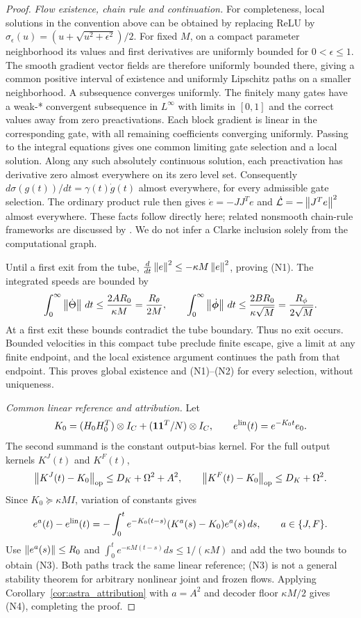 \begin{proof}
\emph{Flow existence, chain rule and continuation.}
For completeness, local solutions in the convention above can be
obtained by replacing ReLU by
$\sigma_\epsilon(u)=(u+\sqrt{u^2+\epsilon^2})/2$.
For fixed $M$, on a compact parameter neighborhood its values and
first derivatives are uniformly bounded for $0<\epsilon\le1$.
The smooth gradient vector fields are therefore uniformly bounded
there, giving a common positive interval of existence and uniformly
Lipschitz paths on a smaller neighborhood. A subsequence converges
uniformly. The finitely many gates have a weak-* convergent subsequence
in $L^\infty$ with limits in $[0,1]$ and the correct values away from
zero preactivations. Each block gradient is linear in the corresponding
gate, with all remaining coefficients converging uniformly. Passing
to the integral equations gives one common limiting gate selection
and a local solution.
Along any such absolutely continuous solution, each preactivation
has derivative zero almost everywhere on its zero level set.
Consequently $d\sigma(g(t))/dt=\gamma(t)\dot g(t)$ almost everywhere,
for every admissible gate selection. The ordinary product rule then
gives $\dot e=-JJ^Te$ and
$\dot{\mathcal{L}}=-\left\lVert J^Te\right\rVert^2$ almost everywhere. These facts follow
directly here; related nonsmooth chain-rule frameworks are discussed
by \citet{astra_davis2020,astra_bolte2021}. We do not infer a Clarke
inclusion solely from the computational graph.

Until a first exit from the tube,
$\frac d{dt}\left\lVert e\right\rVert^2\le-\kappa M\left\lVert e\right\rVert^2$, proving (N1).
The integrated speeds are bounded by
\[
 \int_0^\infty\left\lVert\dot\Theta\right\rVert\,dt\le\frac{2AR_0}{\kappa M}
     =\frac{R_\theta}{2M},\qquad
 \int_0^\infty\left\lVert\dot{{\boldsymbol{\phi}}}\right\rVert\,dt
     \le\frac{2BR_0}{\kappa\sqrt M}
     =\frac{R_\phi}{2\sqrt M}.
\]
At a first exit these bounds contradict the tube boundary. Thus no
exit occurs. Bounded velocities in this compact tube preclude finite
escape, give a limit at any finite endpoint, and the local existence
argument continues the path from that endpoint. This proves global
existence and (N1)--(N2) for every selection, without uniqueness.

\emph{Common linear reference and attribution.}
Let
\[
 K_0=(H_0H_0^T)\otimes I_C+
             (\mathbf1\mathbf1^T/N)\otimes I_C,
 \qquad e^{\rm lin}(t)=e^{-K_0t}e_0.
\]
The second summand is the constant output-bias kernel.
For the full output kernels $K^J(t)$ and $K^F(t)$,
\[
 \left\lVert K^J(t)-K_0\right\rVert_{\rm op}\le D_K+\Omega^2+A^2,
 \qquad
 \left\lVert K^F(t)-K_0\right\rVert_{\rm op}\le D_K+\Omega^2.
\]
Since $K_0\succeq\kappa MI$, variation of constants gives
\[
 e^a(t)-e^{\rm lin}(t)
 =-\int_0^t e^{-K_0(t-s)}(K^a(s)-K_0)e^a(s)\,ds,
 \qquad a\in\{J,F\}.
\]
Use $\left\lVert e^a(s)\right\rVert\le R_0$ and
$\int_0^te^{-\kappa M(t-s)}ds\le1/(\kappa M)$ and add the two
bounds to obtain (N3). Both paths track the same linear reference;
(N3) is not a general stability theorem for arbitrary nonlinear
joint and frozen flows. Applying
Corollary~\ref{cor:astra_attribution} with $a=A^2$ and decoder floor
$\kappa M/2$ gives (N4), completing the proof.
\end{proof}


